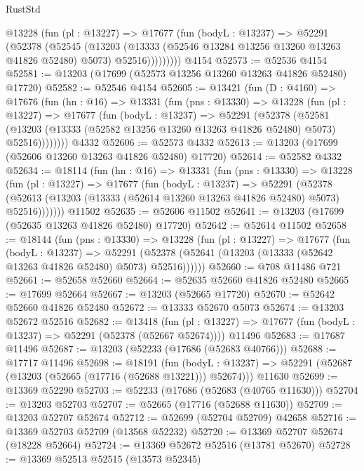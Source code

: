 \begin{lexlean}{RustStd}
\begin{coremodule}
          @13228
            (fun (pl : @13227) =>
            @17677
              (fun (bodyL : @13237) =>
              @52291
                (@52378
                  (@52545
                    (@13203
                      (@13333 (@52546 @13284 @13256 @13260 @13263 @41826 @52480) @5073)
                      @52516)))))))))
    @4154
@52573 := @52536 @4154
@52581 := @13203 (@17699 (@52573 @13256 @13260 @13263 @41826 @52480) @17720)
@52582 := @52546 @4154
@52605 := @13421
    (fun (D : @4160) =>
    @17676
      (fun (hn : @16) =>
      @13331
        (fun (pns : @13330) =>
        @13228
          (fun (pl : @13227) =>
          @17677
            (fun (bodyL : @13237) =>
            @52291
              (@52378
                (@52581
                  (@13203 (@13333 (@52582 @13256 @13260 @13263 @41826 @52480) @5073) @52516))))))))
    @4332
@52606 := @52573 @4332
@52613 := @13203 (@17699 (@52606 @13260 @13263 @41826 @52480) @17720)
@52614 := @52582 @4332
@52634 := @18114
    (fun (hn : @16) =>
    @13331
      (fun (pns : @13330) =>
      @13228
        (fun (pl : @13227) =>
        @17677
          (fun (bodyL : @13237) =>
          @52291
            (@52378
              (@52613 (@13203 (@13333 (@52614 @13260 @13263 @41826 @52480) @5073) @52516)))))))
    @11502
@52635 := @52606 @11502
@52641 := @13203 (@17699 (@52635 @13263 @41826 @52480) @17720)
@52642 := @52614 @11502
@52658 := @18144
    (fun (pns : @13330) =>
    @13228
      (fun (pl : @13227) =>
      @17677
        (fun (bodyL : @13237) =>
        @52291 (@52378 (@52641 (@13203 (@13333 (@52642 @13263 @41826 @52480) @5073) @52516))))))
@52660 := @708 @11486 @721
@52661 := @52658 @52660
@52664 := @52635 @52660 @41826 @52480
@52665 := @17699 @52664
@52667 := @13203 (@52665 @17720)
@52670 := @52642 @52660 @41826 @52480
@52672 := @13333 @52670 @5073
@52674 := @13203 @52672 @52516
@52682 := @13418
    (fun (pl : @13227) => @17677 (fun (bodyL : @13237) => @52291 (@52378 (@52667 @52674))))
    @11496
@52683 := @17687 @11496
@52687 := @13203 (@52233 (@17686 (@52683 @40766)))
@52688 := @17717 @11496
@52698 := @18191
    (fun (bodyL : @13237) => @52291 (@52687 (@13203 (@52665 (@17716 (@52688 @13221))) @52674)))
    @11630
@52699 := @13369 @52290
@52703 := @52233 (@17686 (@52683 (@40765 @11630)))
@52704 := @13203 @52703
@52707 := @52665 (@17716 (@52688 @11630))
@52709 := @13203 @52707 @52674
@52712 := @52699 (@52704 @52709) @42658
@52716 := @13369 @52703 @52709 (@13568 @52232)
@52720 := @13369 @52707 @52674 (@18228 @52664)
@52724 := @13369 @52672 @52516 (@13781 @52670)
@52728 := @13369 @52513 @52515 (@13573 @52345)

\end{coremodule}
\end{lexlean}
